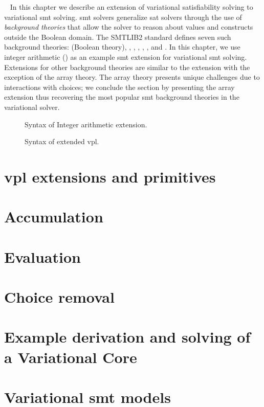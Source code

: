 ~\label{chapter:vsmt}
%
In this chapter we describe an extension of variational satisfiability solving
to variational \ac{smt} solving.
\ac{smt} solvers generalize \ac{sat} solvers through the use of \emph{background
  theories} that allow the solver to reason about values and constructs outside
the Boolean domain. The SMTLIB2 standard defines seven such background theories:
 (Boolean theory), , ,
, , , and . In this chapter,
we use integer arithmetic () as an example \ac{smt} extension for
variational \ac{smt} solving. Extensions for other background theories are
similar to the  extension with the exception of the array theory. The
array theory presents unique challenges due to interactions with choices; we
conclude the section by presenting the array extension thus recovering the most
popular \ac{smt} background theories in the variational solver.

\begin{figure}
  \centering
  
  \caption{Syntax of Integer arithmetic extension.}%
  \label{fig:arith:stx}
\end{figure}
%
\begin{figure}

\centering
\caption{Syntax of extended \ac{vpl}.}%
\label{fig:arith:vpl}
\end{figure}

\section{\ac{vpl} extensions and primitives}


\section{Accumulation}


\section{Evaluation}


\section{Choice removal}


\section{Example derivation and solving of a Variational Core}


\section{Variational \ac{smt} models}


